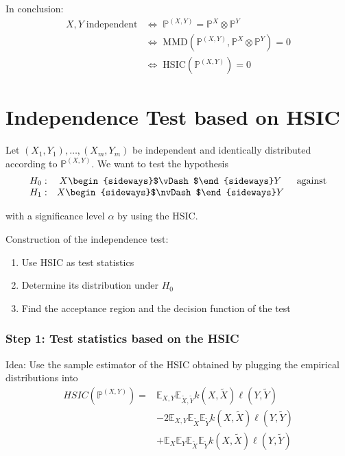 \clearpage

In conclusion:
\begin{align*}
X,Y\; \text{independent}&\Leftrightarrow\;\mathbb{P}^{(X,Y)}=\mathbb{P}^{X}\otimes\mathbb{P}^{Y}\\&\Leftrightarrow\;\text{MMD}(\mathbb{P}^{(X,Y)},\mathbb{P}^{X}\otimes\mathbb{P}^{Y})=0\\&\Leftrightarrow\;\text{HSIC}(\mathbb{P}^{(X,Y)})=0
\end{align*}

\clearpage


\section{Independence Test based on HSIC}
\clearpage
Let $(X_1,Y_1), \ldots, (X_m,Y_m)$ be independent and identically distributed according to $\mathbb{P}^{(X,Y)}$. We want to test the hypothesis
\newcommand{\indep}{\begin{sideways}%
    $\vDash$\end{sideways}}
\newcommand{\dep}{\begin{sideways}%
    $\nvDash$\end{sideways}}
\begin{equation*}
\begin{matrix}
H_0: & X \indep Y & \mbox{ against} \\
H_1: &  X \dep Y &
\end{matrix}
\end{equation*}

with a significance level $\alpha$ by using the HSIC.

\clearpage

Construction of the independence test:
\begin{enumerate}
\item Use HSIC as test statistics
\item Determine its distribution under $H_0$
\item Find the acceptance region and the decision function of the test
\end{enumerate}

\clearpage

\subsubsection{Step 1: Test statistics based on the HSIC}
Idea: Use the sample estimator of the HSIC obtained by plugging the empirical distributions into 
\begin{align*}
HSIC(\mathbb{P}^{(X,Y)})= & \mathbb{E}_{X,Y}\mathbb{E}_{\tilde{X},\tilde{Y}}k(X,\tilde{X})\ell (Y,\tilde{Y}) \\ &-2 \mathbb{E}_{X,Y}\mathbb{E}_{\tilde{X}}\mathbb{E}_{\tilde{Y}}k(X,\tilde{X})\ell (Y,\tilde{Y}) \\ & +\mathbb{E}_{X} \mathbb{E}_{Y}\mathbb{E}_{\tilde{X}}\mathbb{E}_{\tilde{Y}} k(X,\tilde{X})\ell (Y,\tilde{Y})
\end{align*}

